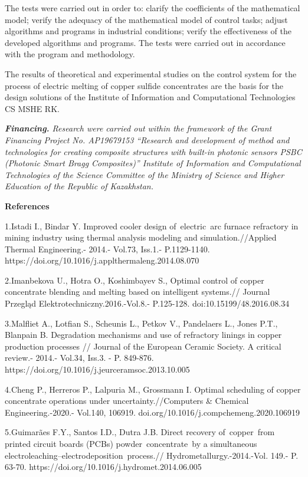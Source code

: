 The tests were carried out in order to: clarify the coefficients of the
mathematical model; verify the adequacy of the mathematical model of
control tasks; adjust algorithms and programs in industrial conditions;
verify the effectiveness of the developed algorithms and programs. The
tests were carried out in accordance with the program and methodology.

The results of theoretical and experimental studies on the control
system for the process of electric melting of copper sulfide
concentrates are the basis for the design solutions of the Institute of
Information and Computational Technologies CS MSHE RK.

\emph{{\bfseries Financing.} Research were carried out within the framework
of the Grant Financing Project No. AP19679153 ``Research and development
of method and technologies for creating composite structures with
built-in photonic sensors PSBC (Photonic Smart Bragg Composites)''
Institute of Information and Computational Technologies of the Science
Committee of the Ministry of Science and Higher Education of the
Republic of Kazakhstan.}

{\bfseries References}

1.Istadi I., Bindar Y. Improved cooler design of~electric~arc furnace
refractory in mining industry using thermal analysis modeling and
simulation.//Applied Thermal Engineering.- 2014.- Vol.73, Iss.1.-
P.1129-1140. https://doi.org/10.1016/j.applthermaleng.2014.08.070

2.Imanbekova U., Hotra O., Koshimbayev S., Optimal control of copper
concentrate blending and melting based on intelligent systems.// Journal
Przegląd Elektrotechniczny.2016.-Vol.8.- P.125-128.
doi:10.15199/48.2016.08.34

3.Malfliet A., Lotfian S., Scheunis L., Petkov V., Pandelaers L., Jones
P.T., Blanpain B. Degradation mechanisms and use of refractory linings
in copper production processes // Journal of the European Ceramic
Society. A critical review.- 2014.- Vol.34, Iss.3. - P. 849-876.
https://doi.org/10.1016/j.jeurceramsoc.2013.10.005

4.Cheng P., Herreros P., Lalpuria M., Grossmann I. Optimal scheduling of
copper concentrate operations under uncertainty.//Computers \& Chemical
Engineering.-2020.- Vol.140, 106919.
doi.org/10.1016/j.compchemeng.2020.106919

5.Guimarães F.Y., Santos I.D., Dutra J.B. Direct recovery of~copper~from
printed circuit boards (PCBs) powder~concentrate~by a simultaneous
electroleaching--electrodeposition~process.//
Hydrometallurgy.-2014.-Vol. 149.- P. 63-70.
https://doi.org/10.1016/j.hydromet.2014.06.005

